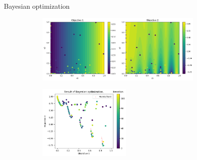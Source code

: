 \documentclass{beamer}
\begin{document}
\begin{frame}{Bayesian optimization}
    \begin{figure}
        \begin{subfigure}
            \centering
            \includegraphics[width=0.9\textwidth]{../Images/DeepKernelLearning/DKL_result_X.png}
        \end{subfigure}
        \begin{subfigure}
            \centering
            \includegraphics[width=0.5\textwidth]{../Images/DeepKernelLearning/DKL_result_Y.png}
        \end{subfigure}
    \end{figure}
\end{frame}
\end{document}

